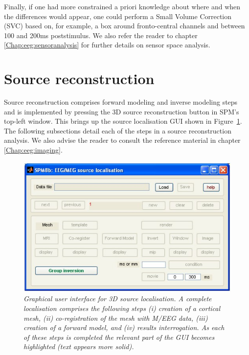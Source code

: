  Finally, if one had more constrained a priori knowledge about where and when the differences would appear, one could perform a Small Volume Correction (SVC) based on, for example, a box around fronto-central channels and between 100 and 200ms poststimulus. We also refer the reader to chapter \ref{Chap:eeg:sensoranalysis} for further details on sensor space analysis.

\section{Source reconstruction}

Source reconstruction comprises forward modeling and inverse modeling steps and is implemented by pressing the
3D source reconstruction button in SPM's top-left window.
This brings up the source localisation GUI shown in Figure~\ref{source_gui}. The following subsections detail each of the steps in a source reconstruction analysis. We also advise the reader to consult the reference material in chapter \ref{Chap:eeg:imaging}.

\begin{figure}
\begin{center}
\includegraphics[width=120mm]{mmn/source-gui}
\caption{\em Graphical user interface for 3D source localisation. A complete localisation comprises the following steps (i) creation of a cortical mesh, (ii) co-registration of the mesh with M/EEG data, (iii) creation of a forward model, and (iv) results interrogation. As each of these steps is completed the relevant part of the GUI becomes highlighted (text appears more solid).
\label{source_gui}}
\end{center}
\end{figure}

